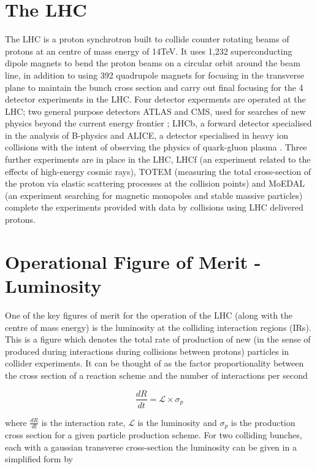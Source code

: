 \section{The LHC}

The LHC is a proton synchrotron built to collide counter rotating beams of protons at an centre of mass energy of 14TeV. It uses 1,232 superconducting dipole magnets to bend the proton beams on a circular orbit around the beam line, in addition to using 392 quadrupole magnets for focusing in the transverse plane to maintain the bunch cross section and carry out final focusing for the 4 detector experiments in the LHC. Four detector experments are operated at the LHC; two general purpose detectors ATLAS and CMS, used for searches of new physics beyond the current energy frontier \cite{ATLASTDR,CMSDR}; LHCb, a forward detector specialised in the analysis of B-physics \cite{LHCb} and ALICE, a detector specialised in heavy ion collisions with the intent of observing the physics of quark-gluon plasma \cite{Lourenco:ALICE}. Three further experiments are in place in the LHC, LHCf (an experiment related to the effects of high-energy cosmic rays), TOTEM (measuring the total cross-section of the proton via elastic scattering processes at the collision points) and MoEDAL (an experiment searching for magnetic monopoles and stable massive particles) complete the experiments provided with data by collisions using LHC delivered protons.

\section{Operational Figure of Merit - Luminosity}

One of the key figures of merit for the operation of the LHC (along with the centre of mass energy) is the luminosity at the colliding interaction regions (IRs). This is a figure which denotes the total rate of production of new (in the sense of produced during interactions during collisions between protons) particles in collider experiments. It can be thought of as the factor proportionality between the cross section of a reaction scheme and the number of interactions per second

\begin{equation} 
\frac{dR}{dt} = \mathcal{L} \times \sigma_{p}
\end{equation}

where $\frac{dR}{dt}$ is the interaction rate, $\mathcal{L}$ is the luminosity and $\sigma_{p}$ is the production cross section for a given particle production scheme. For two colliding bunches, each with a gaussian transverse cross-section the luminosity can be given in a simplified form by


